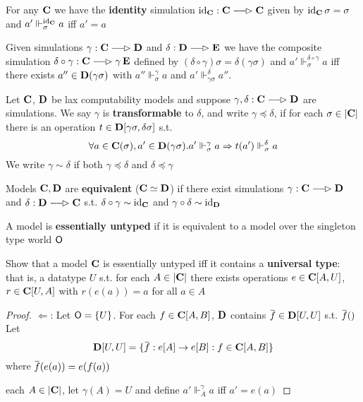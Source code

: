 \documentclass[11pt]{article}
\begin{document}
For any \(\operatorname{\textbf{C}}\) we have the \textbf{identity} simulation \(\id_{\bC}:\bC\lrarhd\bC\) given by \(\operatorname{id}_{\operatorname{\textbf{C}}}\sigma=\sigma\)
and \(a'\Vdash_{\sigma}^{\operatorname{id}_{\operatorname{\textbf{C}}}}a\) iff \(a'=a\)

Given simulations \(\gamma:\bC\lrarhd\bD\) and \(\delta:\bD\lrarhd\bE\) we have the composite
simulation \(\delta\circ\gamma:\bC\lrarhd\gamma\bE\) defined by \((\delta\circ\gamma)\sigma=\delta(\gamma\sigma)\) and \(a'\Vdash_\sigma^{\delta\circ\gamma}a\)  iff there
exists \(a''\in\operatorname{\textbf{D}}(\gamma\sigma)\) with \(a''\Vdash_\sigma^\gamma a\) and \(a'\Vdash_{\gamma\sigma}^\delta a''\).

\begin{definition}[]
Let \(\operatorname{\textbf{C}}\), \(\operatorname{\textbf{D}}\) be lax computability models and suppose \(\gamma,\delta:\bC\lrarhd\bD\) are simulations. We
say \(\gamma\) is \textbf{transformable} to \(\delta\), and write \(\gamma\preceq\delta\), if for each \(\sigma\in\abs{\bC}\) there is an
operation \(t\in\operatorname{\textbf{D}}[\gamma\sigma,\delta\sigma]\) s.t.
\begin{equation*}
\forall a\in\operatorname{\textbf{C}}(\sigma),a'\in\operatorname{\textbf{D}}(\gamma\sigma).a'\Vdash_\sigma^\gamma a\Rightarrow t(a')\Vdash_\sigma^\delta a
\end{equation*}
We write \(\gamma\sim\delta\) if both \(\gamma\preceq\delta\) and \(\delta\preceq\gamma\)
\end{definition}

\begin{definition}[]
Models \(\operatorname{\textbf{C}},\operatorname{\textbf{D}}\) are \textbf{equivalent} (\(\operatorname{\textbf{C}}\simeq\operatorname{\textbf{D}}\)) if there exist simulations \(\gamma:\bC\lrarhd\bD\)
and \(\delta:\bD\lrarhd\bC\) s.t. \(\delta\circ\gamma\sim\operatorname{id}_{\operatorname{\textbf{C}}}\) and \(\gamma\circ\delta\sim\operatorname{id}_{\operatorname{\textbf{D}}}\)
\end{definition}

A model is \textbf{essentially untyped} if it is equivalent to a model over the singleton type world \(\textsf{O}\)

\begin{exercise}
Show that a model \(\operatorname{\textbf{C}}\) is essentially untyped iff it contains a \textbf{universal type}: that is, a
datatype \(U\) s.t. for each \(A\in\abs{\bC}\) there exists operations \(e\in\operatorname{\textbf{C}}[A,U]\), \(r\in\operatorname{\textbf{C}}[U,A]\)
with \(r(e(a))=a\) for all \(a\in A\)
\end{exercise}

\begin{proof}
\(\Leftarrow\): Let \(\textsf{O}=\{U\}\). For each \(f\in\operatorname{\textbf{C}}[A,B]\), \(\operatorname{\textbf{D}}\) contains \(\barf\in\bD[U,U]\) s.t. \(\barf()\)
Let
\begin{equation*}
\bD[U,U]=\{\barf:e[A]\to e[B]:f\in\bC[A,B]\}
\end{equation*}
where \(\barf(e(a))=e(f(a))\)

each \(A\in\abs{\bC}\), let \(\gamma(A)=U\) and define \(a'\Vdash_A^\gamma a\) iff \(a'=e(a)\)
\end{proof}
\end{document}
